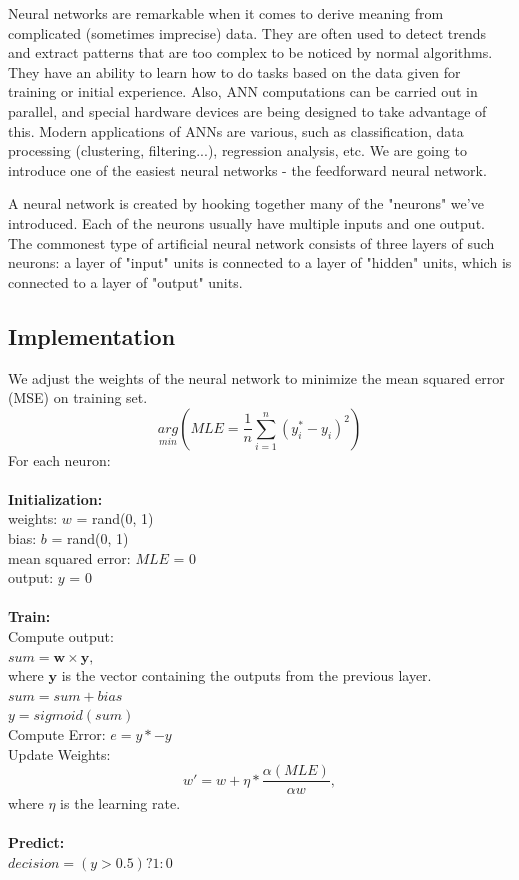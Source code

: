 \documentclass[11pt,letterpaper]{article}
\begin{document}
Neural networks are remarkable when it comes to derive meaning from complicated (sometimes imprecise) data. They are often used to detect trends and extract patterns that are too complex to be noticed by normal algorithms. They have an ability to learn how to do tasks based on the data given for training or initial experience. Also, ANN computations can be carried out in parallel, and special hardware devices are being designed to take advantage of this. Modern applications of ANNs are various, such as classification, data processing (clustering, filtering...), regression analysis, etc. We are going to introduce one of the easiest neural networks - the feedforward neural network.

A neural network is created by hooking together many of the "neurons" we've introduced. Each of the neurons usually have multiple inputs and one output. The commonest type of artificial neural network consists of three layers of such neurons: a layer of "input" units is connected to a layer of "hidden" units, which is connected to a layer of "output" units.

\subsection{Implementation}
\label{sect:pdf}
We adjust the weights of the neural network to minimize the mean squared error (MSE) on training set.
$$\underset{min}{arg} (MLE = \frac{1}{n}\sum_{i=1}^n(y_i^*-y_i)^2)$$
For each neuron:\\\\
\textbf{Initialization:}\\
weights: $w$ = rand(0, 1)\\
bias: $b$ = rand(0, 1)\\
mean squared error: $MLE$ = 0\\
output: $y$ = 0\\\\
\textbf{Train:}\\
Compute output: \\
$sum = \boldsymbol{w}\times \boldsymbol{y},$\\
where $\boldsymbol{y}$ is the vector containing the outputs from the previous layer.\\
$sum = sum + bias$\\
$y = sigmoid(sum)$\\
Compute Error: $e = y* - y$\\
Update Weights:
$$w' = w + \eta *\frac{\alpha (MLE)}{\alpha w},$$
where $\eta$ is the learning rate.\\\\
\textbf{Predict:}\\
$decision = (y > 0.5) ? 1:0$
\end{document}

